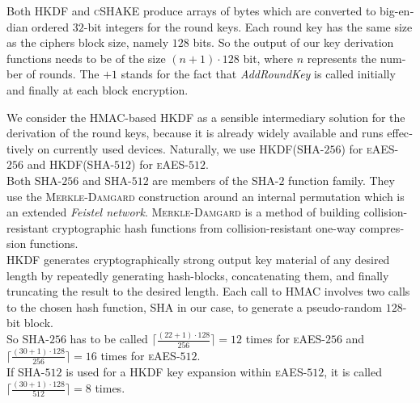 \documentclass[a4paper,11pt]{article}
\begin{document}
\begin{otherlanguage}{english}
\begin{multicols}{2}

\noindent
Both \textsc{HKDF} and \textsc{cSHAKE} produce arrays of bytes which are converted to big-endian ordered $32$-bit integers for the round keys. Each round key has the same size as the ciphers block size, namely $128$ bits. So the output of our key derivation functions needs to be of the size $(n + 1)\cdot 128$ bit, where $n$ represents the number of rounds. The $+ 1$ stands for the fact that \textit{AddRoundKey}  is called initially and finally at each block encryption.\\


\noindent
We consider the \textsc{HMAC}-based \textsc{HKDF} as a sensible intermediary solution for the derivation of the round keys, because it is already widely available and runs effectively on currently used devices. Naturally, we use \textsc{HKDF}(\textsc{SHA}-$256$) for \textsc{eAES}-$256$ and \textsc{HKDF}(\textsc{SHA}-$512$) for \textsc{eAES}-$512$. \\

\noindent
Both \textsc{SHA}-$256$ and \textsc{SHA}-$512$ are members of the \textsc{SHA}-$2$ function family. They use the \textsc{Merkle-Damgard} construction around an internal permutation which is an extended \textit{Feistel network}. \textsc{Merkle-Damgard} is a method of building collision-resistant cryptographic hash functions from collision-resistant one-way compression functions. \\ 

\noindent
\textsc{HKDF} generates cryptographically strong output key material of any desired length by repeatedly generating hash-blocks, concatenating them, and finally truncating the result to the desired length. 
Each call to \textsc{HMAC} involves two calls to the chosen hash function, \textsc{SHA} in our case, to generate a pseudo-random $128$-bit block. \\

\noindent
So \textsc{SHA}-$256$ has to be called $\lceil\frac{(22+1)\cdot128}{256}\rceil=12$ times for \textsc{eAES}-$256$ and $\lceil\frac{(30+1)\cdot128}{256}\rceil=16$ times for \textsc{eAES}-$512$. \\

\noindent
If \textsc{SHA}-$512$ is used for a \textsc{HKDF} key expansion within \textsc{eAES}-$512$, it is called $\lceil\frac{(30+1)\cdot128}{512}\rceil=8$ times.\\



\end{multicols}
\end{otherlanguage}
\end{document}
